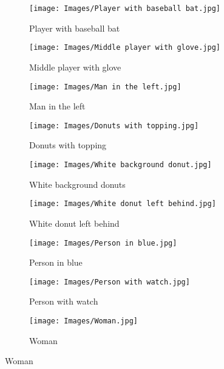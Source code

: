 \begin{figure}[p]
  \centering
  \begin{subfigure}[t]{.32\textwidth}
    \centering
    \caption{Player with baseball bat}\label{fig:baseball-1}
    \texttt{[image: Images/Player with baseball bat.jpg]}
  \end{subfigure}\hfill
  \begin{subfigure}[t]{.32\textwidth}
    \centering
    \caption{Middle player with glove}\label{fig:baseball-2}
    \texttt{[image: Images/Middle player with glove.jpg]}
  \end{subfigure}\hfill
  \begin{subfigure}[t]{.32\textwidth}
    \centering
    \caption{Man in the left}\label{fig:baseball-3}
    \texttt{[image: Images/Man in the left.jpg]}
  \end{subfigure}

  \bigskip
  \begin{subfigure}[t]{.32\textwidth}
    \centering
    \caption{Donuts with topping}\label{fig:donut-1}
    \texttt{[image: Images/Donuts with topping.jpg]}
  \end{subfigure}\hfill
  \begin{subfigure}[t]{.32\textwidth}
    \centering
    \caption{White background donuts}\label{fig:donut-2}
    \texttt{[image: Images/White background donut.jpg]}
  \end{subfigure}\hfill
  \begin{subfigure}[t]{.32\textwidth}
    \centering
    \caption{White donut left behind}\label{fig:donut-3}
    \texttt{[image: Images/White donut left behind.jpg]}
  \end{subfigure}

  \bigskip
  \begin{subfigure}[t]{.3\textwidth}
    \centering
    \caption{Person in blue}\label{fig:bar-1}
    \texttt{[image: Images/Person in blue.jpg]}
  \end{subfigure}\hfill
  \begin{subfigure}[t]{.3\textwidth}
    \centering
    \caption{Person with watch}\label{fig:bar-2}
    \texttt{[image: Images/Person with watch.jpg]}
  \end{subfigure}\hfill
  \begin{subfigure}[t]{.3\textwidth}
    \centering
    \caption{Woman}\label{fig:bar-3}
    \texttt{[image: Images/Woman.jpg]}
  \end{subfigure}


\end{figure}

